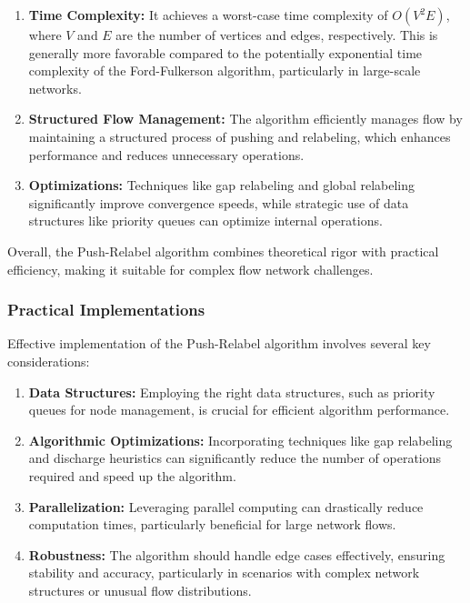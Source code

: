 \documentclass[12pt]{book} %
\begin{document}
\begin{enumerate}
    \item \textbf{Time Complexity:} It achieves a worst-case time complexity of \(O(V^2E)\), where \(V\) and \(E\) are the number of vertices and edges, respectively. This is generally more favorable compared to the potentially exponential time complexity of the Ford-Fulkerson algorithm, particularly in large-scale networks.

    \item \textbf{Structured Flow Management:} The algorithm efficiently manages flow by maintaining a structured process of pushing and relabeling, which enhances performance and reduces unnecessary operations.

    \item \textbf{Optimizations:} Techniques like gap relabeling and global relabeling significantly improve convergence speeds, while strategic use of data structures like priority queues can optimize internal operations.
\end{enumerate}

Overall, the Push-Relabel algorithm combines theoretical rigor with practical efficiency, making it suitable for complex flow network challenges.

\subsubsection{Practical Implementations}

Effective implementation of the Push-Relabel algorithm involves several key considerations:

\begin{enumerate}
    \item \textbf{Data Structures:} Employing the right data structures, such as priority queues for node management, is crucial for efficient algorithm performance.

    \item \textbf{Algorithmic Optimizations:} Incorporating techniques like gap relabeling and discharge heuristics can significantly reduce the number of operations required and speed up the algorithm.

    \item \textbf{Parallelization:} Leveraging parallel computing can drastically reduce computation times, particularly beneficial for large network flows.

    \item \textbf{Robustness:} The algorithm should handle edge cases effectively, ensuring stability and accuracy, particularly in scenarios with complex network structures or unusual flow distributions.
\end{enumerate}
\end{document}
